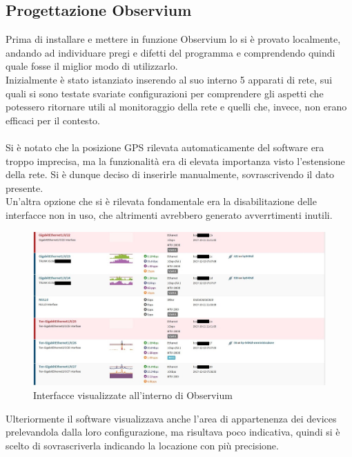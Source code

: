 \documentclass[Realizzazione.tex]{subfiles}
\begin{document}
\subsection{Progettazione Observium}
Prima di installare e mettere in funzione Observium lo si è provato localmente, andando ad individuare pregi e difetti del programma e comprendendo quindi quale fosse il miglior modo di utilizzarlo.\\
Inizialmente è stato istanziato inserendo al suo interno 5 apparati di rete, sui quali si sono testate svariate configurazioni per comprendere gli aspetti che potessero ritornare utili al monitoraggio della rete e quelli che, invece, non erano efficaci per il contesto.\\\\
Si è notato che la posizione GPS rilevata automaticamente del software era troppo imprecisa, ma la funzionalità era di elevata importanza visto l'estensione della rete. Si è dunque deciso di inserirle manualmente, sovrascrivendo il dato presente. \\
Un'altra opzione che si è rilevata fondamentale era la disabilitazione delle interfacce non in uso, che altrimenti avrebbero generato avverrtimenti inutili. \\
\begin{figure}[H]
	\centering
	\includegraphics[width=1\linewidth]{"images/Observium_porte"}
	\caption{Interfacce visualizzate all'interno di Observium}
	\label{fig:Interfacce visualizzate all'interno di Observium}
\end{figure}
Ulteriormente il software visualizzava anche l'area di appartenenza dei devices prelevandola dalla loro configurazione, ma risultava poco indicativa, quindi si è scelto di sovrascriverla indicando la locazione con più precisione.
\end{document}
